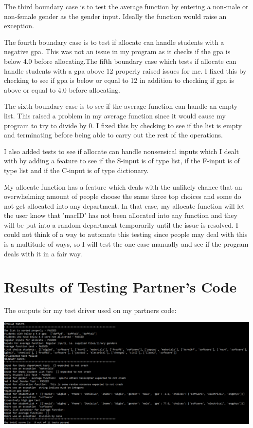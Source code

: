 \documentclass[12pt]{article}
\begin{document}
The third boundary case is to test the average function by entering a non-male or non-female gender as the gender input. Ideally the function would raise an exception. 

The fourth boundary case is to test if allocate can handle students with a negative gpa. This was not an issue in my program as it checks if the gpa is below 4.0 before allocating.The fifth boundary case which tests if allocate can handle students with a gpa above 12 properly raised issues for me. I fixed this by checking to see if gpa is below or equal to 12 in addition to checking if gpa is above or equal to 4.0 before allocating.

The sixth boundary case is to see if the average function can handle an empty list. This raised a problem in my average function since it would cause my program to try to divide by 0. I fixed this by checking to see if the list is empty and terminating before being able to carry out the rest of the operations.

I also added tests to see if allocate can handle nonsensical inputs which I dealt with by adding a feature to see if the S-input is of type list, if the F-input is of type list and if the C-input is of type dictionary.

My allocate function has a feature which deals with the unlikely chance that an overwhelming amount of people choose the same three top choices and some do not get allocated into any department. In that case, my allocate function will let the user know that 'macID' has not been allocated into any function and they will be put into a random department temporarily until the issue is resolved. I could not think of a way to automate this testing since people may deal with this is a multitude of ways, so I will test the one case manually and see if the program deals with it in a fair way.


\section{Results of Testing Partner's Code}

The outputs for my test driver used on my partners code:

\medskip

\begin{center}
	\includegraphics{a1}
\end{center}
\end{document}
